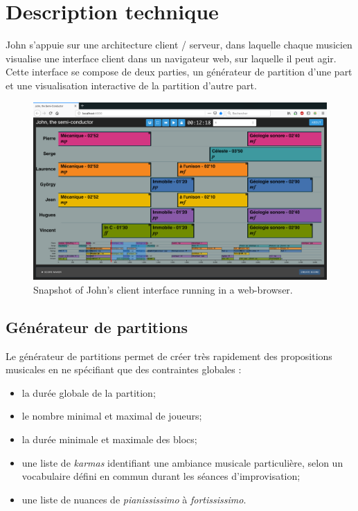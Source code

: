 \section{Description technique}

\noindent John s'appuie sur une architecture client / serveur, dans laquelle chaque musicien visualise une interface client dans un navigateur web, sur laquelle il peut agir. Cette interface se compose de deux parties, un générateur de partition d'une part et une visualisation interactive de la partition d'autre part.
\begin{figure}[!htbp]
	\includegraphics[width=\textwidth]{gfx/notation/John-snapshot.png}
	\caption{Snapshot of John's client interface running in a web-browser.}
	\label{fig:notation:john-snapshot}
\end{figure}

\subsection{Générateur de partitions}

\noindent Le générateur de partitions permet de créer très rapidement des propositions musicales en ne spécifiant que des contraintes globales :
\vspace{-1em}
\begin{itemize}[noitemsep]
	\item la durée globale de la partition;
	\item le nombre minimal et maximal de joueurs;
	\item la durée minimale et maximale des blocs;
	\item une liste de \textit{karmas} identifiant une ambiance musicale particulière, selon un vocabulaire défini en commun durant les séances d'improvisation;
	\item une liste de nuances de \textit{pianississimo} à \textit{fortississimo}.
\end{itemize}

